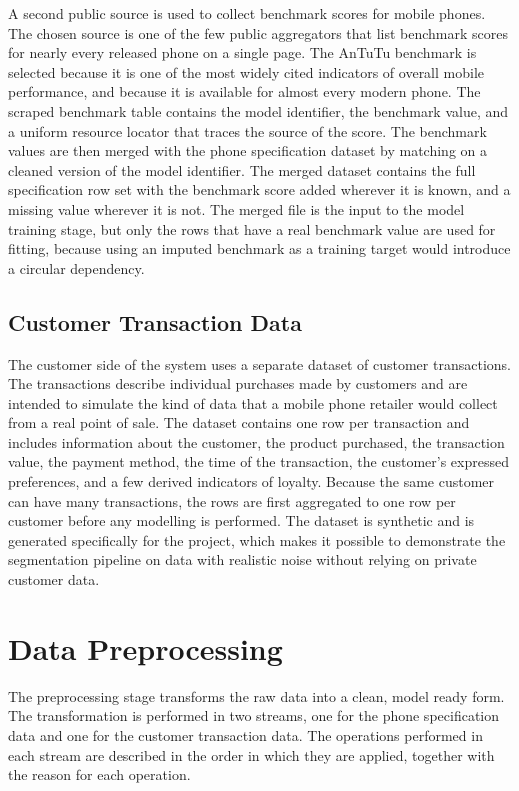 \documentclass[12pt, a4paper]{report}
\numberwithin{figure}{chapter}
\numberwithin{table}{chapter}
\numberwithin{equation}{chapter}
\begin{document}
A second public source is used to collect benchmark scores for mobile phones. The chosen source is one of the few public aggregators that list benchmark scores for nearly every released phone on a single page. The AnTuTu benchmark is selected because it is one of the most widely cited indicators of overall mobile performance, and because it is available for almost every modern phone. The scraped benchmark table contains the model identifier, the benchmark value, and a uniform resource locator that traces the source of the score. The benchmark values are then merged with the phone specification dataset by matching on a cleaned version of the model identifier. The merged dataset contains the full specification row set with the benchmark score added wherever it is known, and a missing value wherever it is not. The merged file is the input to the model training stage, but only the rows that have a real benchmark value are used for fitting, because using an imputed benchmark as a training target would introduce a circular dependency.

\subsection{Customer Transaction Data}

The customer side of the system uses a separate dataset of customer transactions. The transactions describe individual purchases made by customers and are intended to simulate the kind of data that a mobile phone retailer would collect from a real point of sale. The dataset contains one row per transaction and includes information about the customer, the product purchased, the transaction value, the payment method, the time of the transaction, the customer's expressed preferences, and a few derived indicators of loyalty. Because the same customer can have many transactions, the rows are first aggregated to one row per customer before any modelling is performed. The dataset is synthetic and is generated specifically for the project, which makes it possible to demonstrate the segmentation pipeline on data with realistic noise without relying on private customer data.

\section{Data Preprocessing}

The preprocessing stage transforms the raw data into a clean, model ready form. The transformation is performed in two streams, one for the phone specification data and one for the customer transaction data. The operations performed in each stream are described in the order in which they are applied, together with the reason for each operation.
\end{document}
